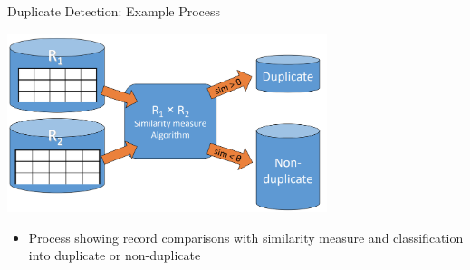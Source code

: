 \documentclass[aspectratio=169]{../latex_main/tntbeamer}  %
\begin{document}
\begin{frame}[c]{Duplicate Detection: Example Process}

\centering\includegraphics[width=0.7\textwidth]{figure/bild25_duplicates}

\begin{itemize}
    \item Process showing record comparisons with similarity measure and classification into duplicate or non-duplicate
\end{itemize}

\end{frame}
\end{document}
